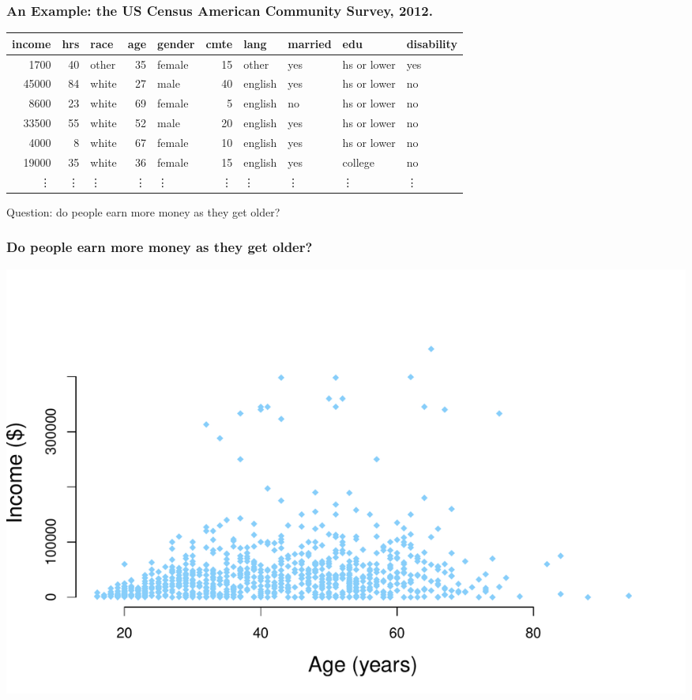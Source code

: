 \documentclass[aspectratio=169]{beamer}
\theoremstyle{principle}
\begin{document}
\begin{frame}
\frametitle{An Example: the US Census American Community Survey, 2012.}
\small
\begin{table}[ht]
\centering
\begin{tabular}{rrlrlrllll}
  \hline
 \textbf{income}  & hrs & race & \textbf{age} & gender & cmte & lang & married & edu & disability \\ 
  \hline
 1700  &  40 & other &  35 & female  &  15 & other & yes & hs or lower & yes \\ 
 45000  &  84 & white &  27 & male  &  40 & english & yes & hs or lower & no \\ 
 8600  &  23 & white &  69 & female  &   5 & english & no & hs or lower & no \\ 
 33500  &  55 & white &  52 & male  &  20 & english & yes & hs or lower & no \\ 
 4000  &   8 & white &  67 & female  &  10 & english & yes & hs or lower & no \\ 
 19000  &  35 & white &  36 & female  &  15 & english & yes & college & no \\ 
\vdots &\vdots &\vdots &\vdots &\vdots &\vdots &\vdots &\vdots &\vdots &\vdots \\
   \hline
\end{tabular}
\end{table}
\bigskip\Large
\begin{center}
Question: do people earn more money as they get older?
\end{center}

\end{frame}

\begin{frame}
\frametitle{Do people earn more money as they get older?}

\begin{center}
\includegraphics[scale=0.6]{income_v_age.pdf}
\end{center}

\end{frame}
\end{document}
